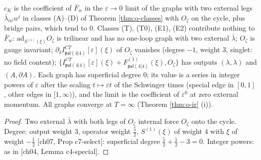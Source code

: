 \begin{proposition}[Graphs of $c_K$]
\label{prop:o-cKgraphs}
$c_K$ is the coefficient of $\bar F_w$ in the $\varepsilon\to0$ limit of the graphs with two external legs $\bar\lambda_{\dot\alpha i}w^i$ in classes (A)--(D) of Theorem \ref{thm:o-classes} with $O_\zeta$ on the cycle, plus bridge pairs, which tend to $0$. Classes (T), (T0), (E1), (E2) contribute nothing to $\bar F_w$: $\mathrm{ad}_{S^{(1)}(\xi)}O_\zeta$ is trilinear and has no one-loop graph with two external $\bar\lambda$; $O_\zeta$ is gauge invariant; $\partial_\delta I^{CT}_{\mathfrak{psl}(4|4)}[\varepsilon](\xi)$ of $O_\zeta$ vanishes (degree $-1$, weight $3$, singlet: no field content); $\{I^{CT}_{\mathfrak{psl}(4|4)}[\varepsilon](\xi)+F^{(1)}_{\mathfrak{psl}(4|4)}(\xi),O_\zeta\}$ has outputs $(\lambda,\lambda)$ and $(A,\partial A)$. Each graph has superficial degree $0$; its value is a series in integer powers of $\varepsilon$ after the scaling $t\mapsto\varepsilon t$ of the Schwinger times (special edge in $[0,1]$, other edges in $[1,\infty)$), and the limit is the coefficient of $\varepsilon^0$ at zero external momentum. All graphs converge at $T=\infty$ (Theorem \ref{thm:o-ir} (i)).
\end{proposition}

\begin{proof}
Two external $\bar\lambda$ with both legs of $O_\zeta$ internal force $O_\zeta$ onto the cycle. Degree: output weight $3$, operator weight $\tfrac52$, $S^{(1)}(\xi)$ of weight $4$ with $\xi$ of weight $-\tfrac12$ [ch07, Prop c7-select]: superficial degree $\tfrac52+\tfrac12-3=0$. Integer powers: as in [ch04, Lemma c4-special].
\end{proof}

